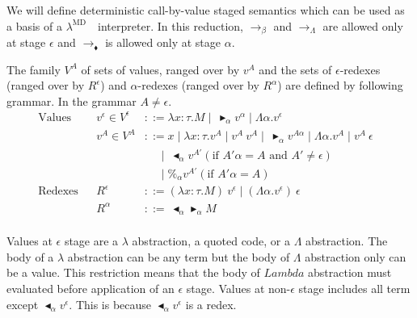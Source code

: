 \documentclass[runningheads]{llncs}
\newcommand{\LMD}{$\lambda^{\textrm{MD}}$\ }
\newcommand{\TB}{\blacktriangleright}
\newcommand{\TBL}{\blacktriangleleft}
\begin{document}
We will define deterministic call-by-value staged semantics which can be used as a basis of a \LMD\ interpreter.
In this reduction, $\longrightarrow_\beta$ and $\longrightarrow_\Lambda$ are allowed only at stage $\epsilon$ and 
$\longrightarrow_\blacklozenge$ is allowed only at stage $\alpha$.

\begin{definition}[Values]
	The family $V^A$ of sets of values, ranged over by $v^A$ and 
	the sets of $\epsilon$-redexes (ranged over by $R^\epsilon$) and $\alpha$-redexes (ranged over by $R^\alpha$)
	are defined by following grammar. In the grammar $A \neq \epsilon$.
	\begin{align*}
		\textrm{Values}  &  & v^\epsilon \in V^\epsilon & ::= \lambda x:\tau.M \mid\ \TB_\alpha v^\alpha \mid \Lambda\alpha.v^\epsilon                                       & \\
		                 &  & v^A \in V^A               & ::= x \mid \lambda x:\tau.v^A \mid v^A\ v^A \mid\ \TB_\alpha v^{A\alpha} \mid \Lambda\alpha.v^A \mid v^A\ \epsilon & \\
		                 &  &                           & \quad\   \mid\ \TBL_\alpha v^{A'} (\text{if } A'\alpha = A \text{ and } A' \neq \epsilon)                           & \\
		                 &  &                           & \quad\   \mid \%_\alpha v^{A'} (\text{if } A'\alpha = A)                                                           & \\
		\textrm{Redexes} &  & R^\epsilon                & ::= (\lambda x:\tau.M)\ v^\epsilon \mid (\Lambda\alpha.v^\epsilon)\ \epsilon                                       & \\
		                 &  & R^\alpha                  & ::=\ \TBL_\alpha \TB_\alpha M                                                                                      & \\
	\end{align*}
\end{definition}

Values at $\epsilon$ stage are a $\lambda$ abstraction, a quoted code, or a $\Lambda$ abstraction.
The body of a $\lambda$ abstraction can be any term but the body of $\Lambda$ abstraction only can be a value.
This restriction means that the body of $Lambda$ abstraction must evaluated before application of an $\epsilon$ stage.
Values at non-$\epsilon$ stage includes all term except $\TBL_\alpha v^\epsilon$.
This is because $\TBL_\alpha v^\epsilon$ is a redex.
\end{document}
